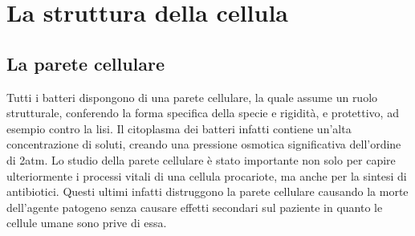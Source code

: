 \chapter{La struttura della cellula}
\section{La parete cellulare}
Tutti i batteri dispongono di una parete cellulare, la quale assume un ruolo strutturale, conferendo la forma specifica della specie e rigidità, e 
protettivo, ad esempio contro la lisi. Il citoplasma dei batteri infatti contiene un’alta concentrazione di soluti, creando una pressione osmotica 
significativa dell’ordine di 2atm. Lo studio della parete cellulare è stato importante non solo per capire 
ulteriormente i processi vitali di una cellula procariote, ma anche per la sintesi di antibiotici. Questi ultimi infatti distruggono la parete cellulare causando la morte dell'agente patogeno senza causare effetti secondari sul paziente
in quanto le cellule umane sono prive di essa.
